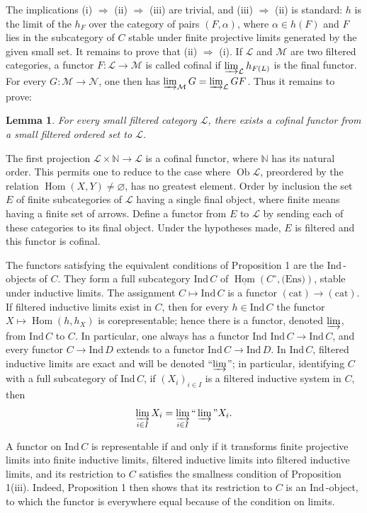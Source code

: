 \documentclass[12pt]{amsart}
\theoremstyle{plain}
\newtheorem{lem}{Lemma}
\theoremstyle{definition}
\DeclareMathOperator{\Hom}{Hom}
\newcommand{\Ind}{\text{Ind}\,}
\newcommand{\cL}{\mathcal{L}}
\newcommand{\cM}{\mathcal{M}}
\newcommand{\cN}{\mathcal{N}}
\newcommand{\cD}{D}
\begin{document}
The implications (i) $\Rightarrow$ (ii) $\Rightarrow$ (iii) are trivial, and (iii) $\Rightarrow$ (ii) is standard: $h$ is the limit of the $h_F$ over the category of pairs $(F,\alpha)$, where $\alpha\in h(F)$ and $F$ lies in the subcategory of $C$ stable under finite projective limits generated by the given small set. It remains to prove that (ii) $\Rightarrow$ (i). If $\cL$ and $\cM$ are two filtered categories, a functor $F:\cL\to\cM$ is called cofinal if $\varinjlim_{\cL} h_{F(L)}$ is the final functor. For every $G:\cM\to\cN$, one then has $\varinjlim_{\cM}G=\varinjlim_{\cL}GF$. Thus it remains to prove:

\begin{lem}
For every small filtered category $\cL$, there exists a cofinal functor from a small filtered ordered set to $\cL$.
\end{lem}

The first projection $\cL\times\mathbb{N}\to\cL$ is a cofinal functor, where $\mathbb{N}$ has its natural order. This permits one to reduce to the case where $\operatorname{Ob}\cL$, preordered by the relation $\Hom(X,Y)\ne\varnothing$, has no greatest element. Order by inclusion the set $E$ of finite subcategories of $\cL$ having a single final object, where finite means having a finite set of arrows. Define a functor from $E$ to $\cL$ by sending each of these categories to its final object. Under the hypotheses made, $E$ is filtered and this functor is cofinal.

The functors satisfying the equivalent conditions of Proposition 1 are the $\Ind$-objects of $C$. They form a full subcategory $\Ind C$ of $\underline{\Hom}(C^{\circ},\text{(Ens)})$, stable under inductive limits. The assignment $C\mapsto\Ind C$ is a functor $(\text{cat})\to(\text{cat})$. If filtered inductive limits exist in $C$, then for every $h\in\Ind C$ the functor $X\mapsto\Hom(h,h_X)$ is corepresentable; hence there is a functor, denoted $\varinjlim$, from $\Ind C$ to $C$. In particular, one always has a functor $\Ind\,\Ind C\to\Ind C$, and every functor $C\to\Ind\cD$ extends to a functor $\Ind C\to\Ind\cD$. In $\Ind C$, filtered inductive limits are exact and will be denoted ``$\varinjlim$''; in particular, identifying $C$ with a full subcategory of $\Ind C$, if $(X_i)_{i\in I}$ is a filtered inductive system in $C$, then
\[
\varinjlim_{i\in I}X_i=\varinjlim_{i\in I}\text{``}\varinjlim\text{''}X_i.
\]

A functor on $\Ind C$ is representable if and only if it transforms finite projective limits into finite inductive limits, filtered inductive limits into filtered inductive limits, and its restriction to $C$ satisfies the smallness condition of Proposition 1(iii). Indeed, Proposition 1 then shows that its restriction to $C$ is an $\Ind$-object, to which the functor is everywhere equal because of the condition on limits.
\end{document}
